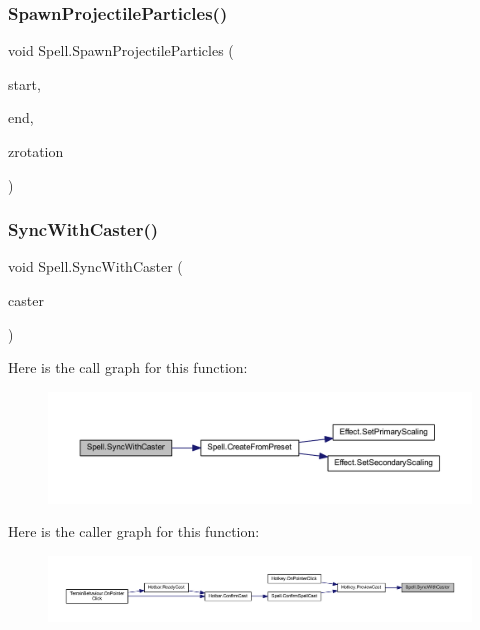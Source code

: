 \mbox{\label{class_spell_aaaea2d98c141ffd0838bac9ac5641349}} 
\subsubsection{\texorpdfstring{SpawnProjectileParticles()}{SpawnProjectileParticles()}}
{\footnotesize\ttfamily void Spell.\+Spawn\+Projectile\+Particles (\begin{DoxyParamCaption}\item[{Vector2\+Int}]{start,  }\item[{Vector2\+Int}]{end,  }\item[{float}]{zrotation }\end{DoxyParamCaption})}

\mbox{\label{class_spell_a65c49405edc86456dfdace46c81b1530}} 
\subsubsection{\texorpdfstring{SyncWithCaster()}{SyncWithCaster()}}
{\footnotesize\ttfamily void Spell.\+Sync\+With\+Caster (\begin{DoxyParamCaption}\item[{\mbox{\hyperlink{class_base_unit}{Base\+Unit}}}]{caster }\end{DoxyParamCaption})}

Here is the call graph for this function\+:
\nopagebreak
\begin{figure}[H]
\begin{center}
\leavevmode
\includegraphics[width=350pt]{class_spell_a65c49405edc86456dfdace46c81b1530_cgraph}
\end{center}
\end{figure}
Here is the caller graph for this function\+:
\nopagebreak
\begin{figure}[H]
\begin{center}
\leavevmode
\includegraphics[width=350pt]{class_spell_a65c49405edc86456dfdace46c81b1530_icgraph}
\end{center}
\end{figure}


